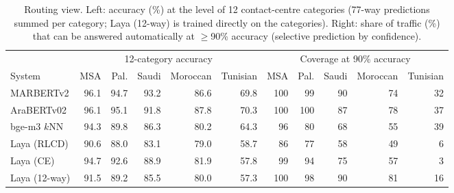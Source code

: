 \begin{table}[t]\centering\small\setlength{\tabcolsep}{4pt}\caption{Routing view. Left: accuracy (\%) at the level of 12 contact-centre categories (77-way predictions summed per category; Laya (12-way) is trained directly on the categories). Right: share of traffic (\%) that can be answered automatically at $\geq$90\% accuracy (selective prediction by confidence).}\label{tab:routing}
\begin{tabular}{lrrrrrrrrrr}\toprule
& \multicolumn{5}{c}{12-category accuracy} & \multicolumn{5}{c}{Coverage at 90\% accuracy}\\
System & MSA & Pal. & Saudi & Moroccan & Tunisian & MSA & Pal. & Saudi & Moroccan & Tunisian \\\midrule
MARBERTv2 & 96.1 & 94.7 & 93.2 & 86.6 & 69.8 & 100 & 99 & 90 & 74 & 32 \\
AraBERTv02 & 96.1 & 95.1 & 91.8 & 87.8 & 70.3 & 100 & 100 & 87 & 78 & 37 \\
bge-m3 $k$NN & 94.3 & 89.8 & 86.3 & 80.2 & 64.3 & 96 & 80 & 68 & 55 & 39 \\
Laya (RLCD) & 90.6 & 88.0 & 83.1 & 79.0 & 58.7 & 86 & 77 & 58 & 49 & 6 \\
Laya (CE) & 94.7 & 92.6 & 88.9 & 81.9 & 57.8 & 99 & 94 & 75 & 57 & 3 \\
Laya (12-way) & 91.5 & 89.2 & 85.5 & 80.0 & 57.3 & 100 & 98 & 90 & 81 & 16 \\
\bottomrule\end{tabular}\end{table}
